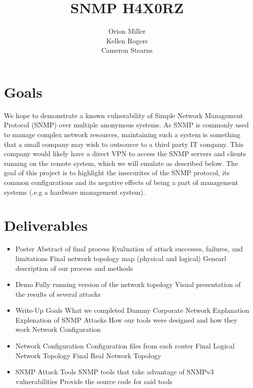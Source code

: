 \documentclass[11pt]{article}
\title{SNMP H4X0RZ}
\author{Orion Miller \\ Kellen Rogers \\ Cameron Stearns}
\begin{document}
\singlespace

\maketitle


\setcounter{secnumdepth}{2}

\section{Goals}
We hope to demonstrate a known vulnerability of Simple Network Management 
Protocol (SNMP) over multiple anonymous systems.  As SNMP is commonly used 
to manage complex network resources, maintaining such a system is something 
that a small company may wish to outsource to a third party IT company.  
This company would likely have a direct VPN to access the SNMP servers and 
clients running on the remote system, which we will emulate as described below. 
The goal of this project is to highlight the insecurites of the SNMP protocol,
its common configurations and its negative effects of being a part of 
management systems (.e.g a hardware management system).

\section{Deliverables}

\begin{itemize}
\item Poster
  \subitem Abstract of final process
  \subitem Evaluation of attack successes, failures, and limitations
  \subitem Final network topology map (physical and logical)
  \subitem Genearl description of our process and methods

\item Demo
  \subitem Fully running version of the network topology %
  \subitem Visual presentation of the results of several attacks

\item Write-Up
  \subitem Goals
  \subitem What we completed
  \subitem Dummy Corporate Network Explanation
  \subitem Explenation of SNMP Attacks
  \subitem How our tools were designed and how they work
  \subitem Network Configuration

\item Network Configuration
  \subitem Configuration files from each router
  \subitem Final Logical Network Topology
  \subitem Final Real Network Topology

\item SNMP Attack Tools
  \subitem SNMP tools that take advantage of SNMPv3  vulnerabilities
  \subitem Provide the source code for said tools

\end{itemize}
\end{document}
